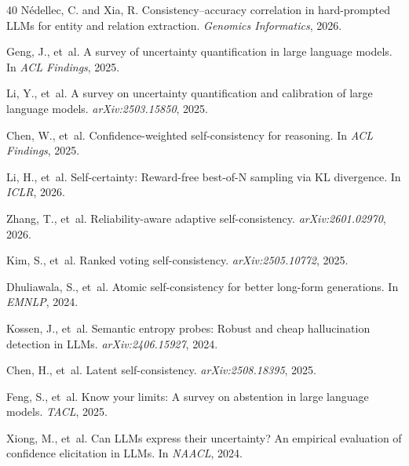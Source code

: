 \documentclass[11pt,a4paper]{article}
\begin{document}
\begin{thebibliography}{40}
N{\'e}dellec, C. and Xia, R.
\newblock Consistency--accuracy correlation in hard-prompted {LLM}s for entity and relation extraction.
\newblock \emph{Genomics Informatics}, 2026.

Geng, J., et~al.
\newblock A survey of uncertainty quantification in large language models.
\newblock In \emph{ACL Findings}, 2025.

Li, Y., et~al.
\newblock A survey on uncertainty quantification and calibration of large language models.
\newblock \emph{arXiv:2503.15850}, 2025.

Chen, W., et~al.
\newblock Confidence-weighted self-consistency for reasoning.
\newblock In \emph{ACL Findings}, 2025.

Li, H., et~al.
\newblock Self-certainty: Reward-free best-of-{N} sampling via {KL} divergence.
\newblock In \emph{ICLR}, 2026.

Zhang, T., et~al.
\newblock Reliability-aware adaptive self-consistency.
\newblock \emph{arXiv:2601.02970}, 2026.

Kim, S., et~al.
\newblock Ranked voting self-consistency.
\newblock \emph{arXiv:2505.10772}, 2025.

Dhuliawala, S., et~al.
\newblock Atomic self-consistency for better long-form generations.
\newblock In \emph{EMNLP}, 2024.

Kossen, J., et~al.
\newblock Semantic entropy probes: Robust and cheap hallucination detection in {LLM}s.
\newblock \emph{arXiv:2406.15927}, 2024.

Chen, H., et~al.
\newblock Latent self-consistency.
\newblock \emph{arXiv:2508.18395}, 2025.

Feng, S., et~al.
\newblock Know your limits: A survey on abstention in large language models.
\newblock \emph{TACL}, 2025.

Xiong, M., et~al.
\newblock Can {LLM}s express their uncertainty? An empirical evaluation of confidence elicitation in {LLM}s.
\newblock In \emph{NAACL}, 2024.


\end{thebibliography}
\end{document}

